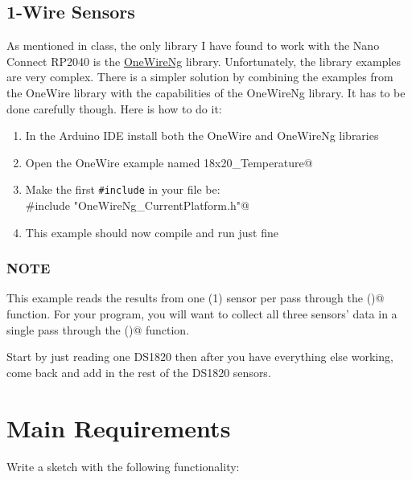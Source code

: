 \subsection{1-Wire Sensors}
As mentioned in class, the only library I have found to work with the Nano Connect 
RP2040 is the \href{https://github.com/pstolarz/OneWireNg}{OneWireNg} library. 
Unfortunately, the library examples are very complex. There is a simpler solution by 
combining the examples from the OneWire library with the capabilities of the OneWireNg 
library. It has to be done carefully though. Here is how to do it:
\begin{enumerate}
    \item In the Arduino IDE install both the OneWire and OneWireNg libraries
    \item Open the OneWire example named \lstinline@DS18x20_Temperature@ 
    \item Make the first \lstinline|#include| in your file be:\\
            \lstinline@#include "OneWireNg_CurrentPlatform.h"@ 
    \item This example should now compile and run just fine 
\end{enumerate}

\subsubsection{NOTE}
This example reads the results from one (1) sensor per pass through the 
\lstinline@loop()@ function. For your program, you will want to collect 
all three sensors' data in a single pass through the \lstinline@loop()@ 
function. 

Start by just reading one DS1820 then after you have everything
else working, come back and add in the rest of the DS1820 sensors.

\section{Main Requirements}
Write a sketch with the following functionality:

